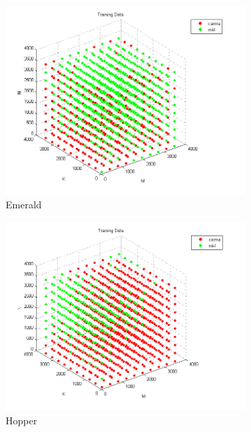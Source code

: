 \begin{figure}
    \centering
        \begin{subfigure}[b]{0.3\textwidth}
            \includegraphics[width=\textwidth]{figures/emerald_train.png}
            \caption{Emerald}
            \label{f:train_emerald}
            \end{subfigure}
        \begin{subfigure}[b]{0.3\textwidth}
            \includegraphics[width=\textwidth]{figures/hopper_train.png}
            \caption{Hopper}
            \label{f:train_hopper}
        \end{subfigure}
        \begin{subfigure}[b]{0.3\textwidth}

\end{subfigure}
\end{figure}
